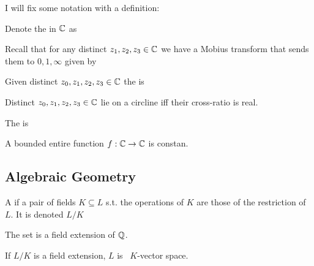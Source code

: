 \documentclass{article}
\begin{document}
I will fix some notation with a definition:

\begin{definition}
	Denote the  in $\mathbb{C}$ as 
\end{definition}

Recall that for any distinct $z_1, z_2, z_3 \in \mathbb{C}$ we have a Mobius transform that sends them to $0,1,\infty$ given by 
\begin{definition}
Given distinct $z_0, z_1, z_2, z_3 \in \mathbb{C}$ the  is 
\end{definition}

\begin{prop}
Distinct $z_0, z_1, z_2, z_3 \in \mathbb{C}$ lie on a circline iff their cross-ratio is real. 
\end{prop}

\begin{definition}
	The  is 
\end{definition}

\begin{theorem}[Liouville]
	A bounded entire function $f:\mathbb{C} \to \mathbb{C}$ is constan. 
\end{theorem}

\subsection{Algebraic Geometry}

\begin{definition}
	A  if a pair of fields $K \subseteq L$ s.t. the operations of $K$ are those of the restriction of $L$. It is denoted $L / K$
\end{definition}

\begin{example}
	The set 
is a field extension of $\mathbb{Q}$. 
\end{example}

\begin{prop}
	If $L/K$ is a field extension, $L$ is \ $K$-vector space. 
\end{prop}
\end{document}
